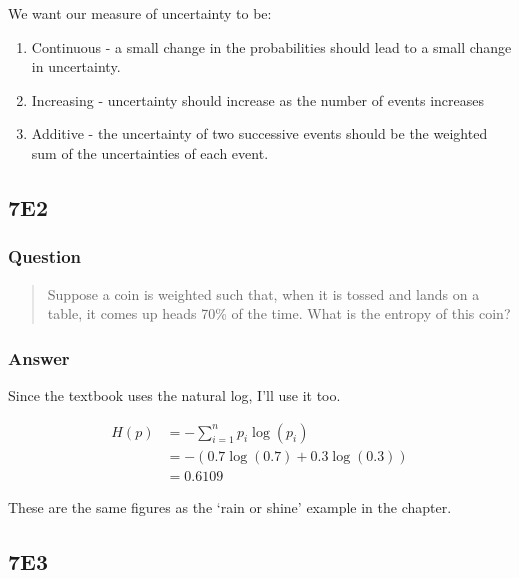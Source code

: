 \documentclass[
]{book}
\providecommand{\tightlist}{%
  \setlength{\itemsep}{0pt}\setlength{\parskip}{0pt}}
\begin{document}
We want our measure of uncertainty to be:

\begin{enumerate}
\def\labelenumi{\arabic{enumi}.}
\tightlist
\item
  Continuous - a small change in the probabilities should lead to a small change in uncertainty.
\item
  Increasing - uncertainty should increase as the number of events increases
\item
  Additive - the uncertainty of two successive events should be the weighted sum of the uncertainties of each event.
\end{enumerate}

\hypertarget{e2-4}{%
\subsection*{7E2}\label{e2-4}}

\hypertarget{question-61}{%
\subsubsection*{Question}\label{question-61}}

\begin{quote}
Suppose a coin is weighted such that, when it is tossed and lands on a table, it comes up heads 70\% of the time. What is the entropy of this coin?
\end{quote}

\hypertarget{answer-61}{%
\subsubsection*{Answer}\label{answer-61}}

Since the textbook uses the natural log, I'll use it too.

\[\begin{aligned}
H(p) &= -\sum^n_{i=1}p_i \log(p_i) \\
&= -(0.7 \log(0.7) + 0.3 \log(0.3))\\
&= 0.6109
\end{aligned}\]

These are the same figures as the `rain or shine' example in the chapter.

\hypertarget{e3-5}{%
\subsection*{7E3}\label{e3-5}}
\end{document}
